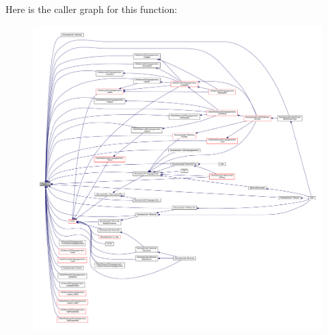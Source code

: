 Here is the caller graph for this function\-:\nopagebreak
\begin{figure}[H]
\begin{center}
\leavevmode
\includegraphics[width=350pt]{toolboxes_2rnd_2userintf_8cpp_a286fff8437e15b1a6ba210f84af9fce0_icgraph}
\end{center}
\end{figure}



